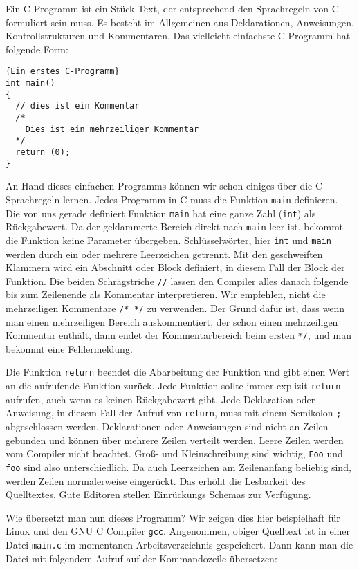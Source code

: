 Ein C-Programm ist ein Stück Text, der entsprechend den Sprachregeln von C formuliert sein muss.
Es besteht im Allgemeinen aus Deklarationen, Anweisungen, Kontrollstrukturen und Kommentaren.
Das vielleicht einfachste C-Programm hat folgende Form:
\begin{lstlisting}{Ein erstes C-Programm}
int main()
{
  // dies ist ein Kommentar
  /*
    Dies ist ein mehrzeiliger Kommentar
  */
  return (0);
}
\end{lstlisting}
An Hand dieses einfachen Programms können wir schon einiges über die C Sprachregeln lernen.
Jedes Programm in C muss die Funktion \texttt{main} definieren. 
Die von uns gerade definiert Funktion \texttt{main} hat eine ganze Zahl (\texttt{int}) als Rückgabewert.
Da der geklammerte Bereich direkt nach \texttt{main} leer ist, bekommt die Funktion keine Parameter übergeben.
Schlüsselwörter, hier \texttt{int} und \texttt{main} werden durch ein oder mehrere Leerzeichen getrennt.
Mit den geschweiften Klammern wird ein Abschnitt oder Block definiert, in diesem Fall der Block der Funktion.
Die beiden Schrägstriche \texttt{//} lassen den Compiler alles danach folgende bis zum Zeilenende als Kommentar interpretieren.
Wir empfehlen, nicht die mehrzeiligen Kommentare \texttt{/* */} zu verwenden.
Der Grund dafür ist, dass wenn man einen mehrzeiligen Bereich auskommentiert, der schon einen mehrzeiligen Kommentar enthält, dann endet der Kommentarbereich beim ersten \texttt{*/}, und man bekommt eine Fehlermeldung.

Die Funktion \texttt{return} beendet die Abarbeitung der Funktion und gibt einen Wert an die aufrufende Funktion zurück.
Jede Funktion sollte immer explizit \texttt{return} aufrufen, auch wenn es keinen Rückgabewert gibt.
Jede Deklaration oder Anweisung, in diesem Fall der Aufruf von \texttt{return}, muss mit einem Semikolon \texttt{;} abgeschlossen werden.
Deklarationen oder Anweisungen sind nicht an Zeilen gebunden und können über mehrere Zeilen verteilt werden. 
Leere Zeilen werden vom Compiler nicht beachtet.
Groß- und Kleinschreibung sind wichtig, \texttt{Foo} und \texttt{foo} sind also unterschiedlich.
Da auch Leerzeichen am Zeilenanfang beliebig sind, werden Zeilen normalerweise eingerückt.
Das erhöht die Lesbarkeit des Quelltextes.
Gute Editoren stellen Einrückungs Schemas zur Verfügung.

Wie übersetzt man nun dieses Programm?
Wir zeigen dies hier beispielhaft für Linux und den GNU C Compiler \texttt{gcc}.
Angenommen, obiger Quelltext ist in einer Datei \texttt{main.c} im momentanen Arbeitsverzeichnis gespeichert.
Dann kann man die Datei mit folgendem Aufruf auf der Kommandozeile übersetzen:

